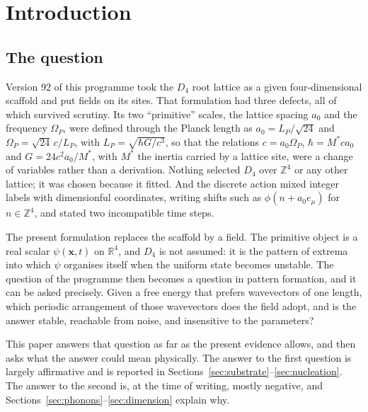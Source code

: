 \documentclass[a4paper,11pt]{article}
\numberwithin{equation}{section}
\theoremstyle{jsplain}
\theoremstyle{jsrem}
\begin{document}
\tableofcontents
\clearpage

\section{Introduction}\label{sec:intro}

\subsection{The question}

Version 92 of this programme took the $D_4$ root lattice as a given four-dimensional scaffold and put fields on its sites. That formulation had three defects, all of which survived scrutiny. Its two ``primitive'' scales, the lattice spacing $a_0$ and the frequency $\Omega_P$, were defined through the Planck length as $a_0=L_P/\sqrt{24}$ and $\Omega_P=\sqrt{24}\,c/L_P$, with $L_P=\sqrt{\hbar G/c^3}$, so that the relations $c=a_0\Omega_P$, $\hbar=M^*ca_0$ and $G=24c^2a_0/M^*$, with $M^*$ the inertia carried by a lattice site, were a change of variables rather than a derivation. Nothing selected $D_4$ over $\mathbb{Z}^4$ or any other lattice; it was chosen because it fitted. And the discrete action mixed integer labels with dimensionful coordinates, writing shifts such as $\phi(n+a_0e_\mu)$ for $n\in\mathbb{Z}^4$, and stated two incompatible time steps.

The present formulation replaces the scaffold by a field. The primitive object is a real scalar $\psi(\mathbf{x},t)$ on $\mathbb{R}^4$, and $D_4$ is not assumed: it is the pattern of extrema into which $\psi$ organises itself when the uniform state becomes unstable. The question of the programme then becomes a question in pattern formation, and it can be asked precisely. Given a free energy that prefers wavevectors of one length, which periodic arrangement of those wavevectors does the field adopt, and is the answer stable, reachable from noise, and insensitive to the parameters?

This paper answers that question as far as the present evidence allows, and then asks what the answer could mean physically. The answer to the first question is largely affirmative and is reported in Sections~\ref{sec:substrate}--\ref{sec:nucleation}. The answer to the second is, at the time of writing, mostly negative, and Sections~\ref{sec:phonons}--\ref{sec:dimension} explain why.
\end{document}
